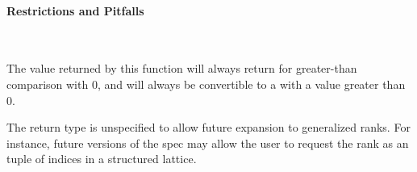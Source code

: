 \paragraph{Restrictions and Pitfalls}\mbox{} \\
\begin{compactitem}
  \item The value returned by this function will always return 
  for greater-than comparison with 0, and will always be convertible to a
     with a value greater than 0.
  \item The return type is unspecified to allow future expansion to generalized
  ranks.  For instance, future versions of the spec may allow the user to
    request the rank as an  tuple of indices in a structured
  lattice.
\end{compactitem}

